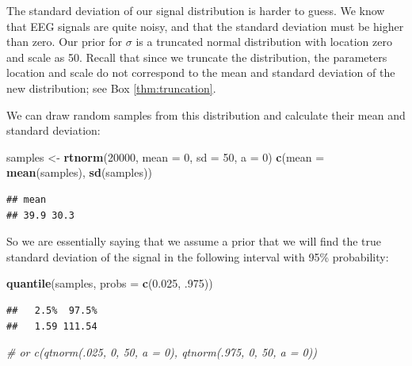 \documentclass[12pt,]{krantz}
\newenvironment{Shaded}{\begin{snugshade}}{\end{snugshade}}
\newcommand{\KeywordTok}[1]{\textcolor[rgb]{0.13,0.29,0.53}{\textbf{#1}}}
\newcommand{\DataTypeTok}[1]{\textcolor[rgb]{0.13,0.29,0.53}{#1}}
\newcommand{\DecValTok}[1]{\textcolor[rgb]{0.00,0.00,0.81}{#1}}
\newcommand{\FloatTok}[1]{\textcolor[rgb]{0.00,0.00,0.81}{#1}}
\newcommand{\StringTok}[1]{\textcolor[rgb]{0.31,0.60,0.02}{#1}}
\newcommand{\CommentTok}[1]{\textcolor[rgb]{0.56,0.35,0.01}{\textit{#1}}}
\newcommand{\NormalTok}[1]{#1}
\theoremstyle{definition}
\theoremstyle{definition}
\theoremstyle{definition}
\theoremstyle{remark}
\begin{document}
The standard deviation of our signal distribution is harder to guess. We
know that EEG signals are quite noisy, and that the standard deviation
must be higher than zero. Our prior for \(\sigma\) is a truncated normal
distribution with location zero and scale as 50. Recall that since we
truncate the distribution, the parameters location and scale do not
correspond to the mean and standard deviation of the new distribution;
see Box \ref{thm:truncation}.

We can draw random samples from this distribution and calculate their
mean and standard deviation:

\begin{Shaded}
\begin{Highlighting}[]
\NormalTok{samples <-}\StringTok{ }\KeywordTok{rtnorm}\NormalTok{(}\DecValTok{20000}\NormalTok{, }\DataTypeTok{mean =} \DecValTok{0}\NormalTok{, }\DataTypeTok{sd =} \DecValTok{50}\NormalTok{, }\DataTypeTok{a =} \DecValTok{0}\NormalTok{)}
\KeywordTok{c}\NormalTok{(}\DataTypeTok{mean =} \KeywordTok{mean}\NormalTok{(samples), }\KeywordTok{sd}\NormalTok{(samples))}
\end{Highlighting}
\end{Shaded}

\begin{verbatim}
## mean      
## 39.9 30.3
\end{verbatim}

So we are essentially saying that we assume a prior that we will find
the true standard deviation of the signal in the following interval with
95\% probability:

\begin{Shaded}
\begin{Highlighting}[]
\KeywordTok{quantile}\NormalTok{(samples, }\DataTypeTok{probs =} \KeywordTok{c}\NormalTok{(}\FloatTok{0.025}\NormalTok{, }\FloatTok{.975}\NormalTok{))}
\end{Highlighting}
\end{Shaded}

\begin{verbatim}
##   2.5%  97.5% 
##   1.59 111.54
\end{verbatim}

\begin{Shaded}
\begin{Highlighting}[]
\CommentTok{# or c(qtnorm(.025, 0, 50, a = 0), qtnorm(.975, 0, 50, a = 0))}
\end{Highlighting}
\end{Shaded}
\end{document}
